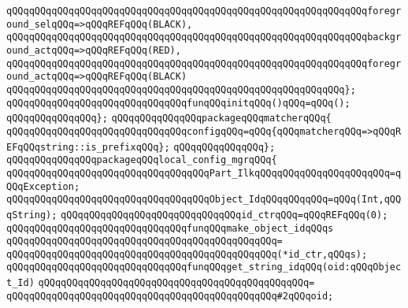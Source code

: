 \verb|qQQqqQQqqQQqqQQqqQQqqQQqqQQqqQQqqQQqqQQqqQQqqQQqqQQqqQQqqQQqqQQqforeground_selqQQq=>qQQqREFqQQq(BLACK),|\newline
\verb|qQQqqQQqqQQqqQQqqQQqqQQqqQQqqQQqqQQqqQQqqQQqqQQqqQQqqQQqqQQqqQQqbackground_actqQQq=>qQQqREFqQQq(RED),|\newline
\verb|qQQqqQQqqQQqqQQqqQQqqQQqqQQqqQQqqQQqqQQqqQQqqQQqqQQqqQQqqQQqqQQqforeground_actqQQq=>qQQqREFqQQq(BLACK)|\newline
\verb|qQQqqQQqqQQqqQQqqQQqqQQqqQQqqQQqqQQqqQQqqQQqqQQqqQQqqQQqqQQq};|\newline
\newline
\verb|qQQqqQQqqQQqqQQqqQQqqQQqqQQqqQQqfunqQQqinitqQQq()qQQq=qQQq();|\newline
\verb|qQQqqQQqqQQqqQQq};|\newline
\newline
\verb|qQQqqQQqqQQqqQQqpackageqQQqmatcherqQQq{|\newline
\verb|qQQqqQQqqQQqqQQqqQQqqQQqqQQqqQQqconfigqQQq=qQQq{qQQqmatcherqQQq=>qQQqREFqQQqstring::is_prefixqQQq};|\newline
\verb|qQQqqQQqqQQqqQQq};|\newline
\newline
\verb|qQQqqQQqqQQqqQQqpackageqQQqlocal_config_mgrqQQq{|\newline
\newline
\verb|qQQqqQQqqQQqqQQqqQQqqQQqqQQqqQQqqQQqPart_IlkqQQqqQQqqQQqqQQqqQQqqQQq=qQQqException;|\newline
\verb|qQQqqQQqqQQqqQQqqQQqqQQqqQQqqQQqqQQqObject_IdqQQqqQQqqQQq=qQQq(Int,qQQqString);|\newline
\newline
\verb|qQQqqQQqqQQqqQQqqQQqqQQqqQQqqQQqid_ctrqQQq=qQQqREFqQQq(0);|\newline
\newline
\verb|qQQqqQQqqQQqqQQqqQQqqQQqqQQqqQQqfunqQQqmake_object_idqQQqs|\newline
\verb|qQQqqQQqqQQqqQQqqQQqqQQqqQQqqQQqqQQqqQQqqQQqqQQq=|\newline
\verb|qQQqqQQqqQQqqQQqqQQqqQQqqQQqqQQqqQQqqQQqqQQqqQQq(*id_ctr,qQQqs);|\newline
\newline
\verb|qQQqqQQqqQQqqQQqqQQqqQQqqQQqqQQqfunqQQqget_string_idqQQq(oid:qQQqObject_Id)|\newline
\verb|qQQqqQQqqQQqqQQqqQQqqQQqqQQqqQQqqQQqqQQqqQQqqQQq=|\newline
\verb|qQQqqQQqqQQqqQQqqQQqqQQqqQQqqQQqqQQqqQQqqQQqqQQq#2qQQqoid;|\newline
